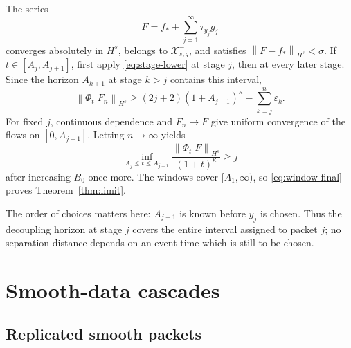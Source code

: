 \documentclass[10pt,a4paper]{amsart}
\numberwithin{equation}{section}
\newcommand{\X}{\mathcal X}
\newcommand{\eps}{\varepsilon}
\newcommand{\norm}[1]{\left\lVert #1\right\rVert}
\newcommand{\flow}[1]{\Phi^{#1}}
\newcommand{\trans}[1]{\tau_{#1}}
\begin{document}
The series
\begin{equation}\label{eq:F-limit}
 F=f_*+\sum_{j=1}^\infty\trans{y_j}g_j
\end{equation}
converges absolutely in $H^s$, belongs to $\X^-_{s,q}$, and satisfies
$\norm{F-f_*}_{H^s}<\sigma$.  If $t\in[A_j,A_{j+1}]$, first apply
\eqref{eq:stage-lower} at stage $j$, then at every later stage.  Since the
horizon $A_{k+1}$ at stage $k>j$ contains this interval,
\[
 \norm{\flow-_tF_n}_{H^s}
 \geq(2j+2)(1+A_{j+1})^\kappa-
 \sum_{k=j}^n\eps_k.
\]
For fixed $j$, continuous dependence and $F_n\to F$ give uniform convergence
of the flows on $[0,A_{j+1}]$.  Letting $n\to\infty$ yields
\begin{equation}\label{eq:window-final}
 \inf_{A_j\leq t\leq A_{j+1}}
 \frac{\norm{\flow-_tF}_{H^s}}{(1+t)^\kappa}
 \geq j
\end{equation}
after increasing $B_0$ once more.  The windows cover $[A_1,\infty)$, so
\eqref{eq:window-final} proves Theorem~\ref{thm:limit}.

The order of choices matters here: $A_{j+1}$ is known before $y_j$ is chosen.
Thus the decoupling horizon at stage $j$ covers the entire interval assigned
to packet $j$; no separation distance depends on an event time which is still
to be chosen.

\section{Smooth-data cascades}\label{sec:smooth-data}

\subsection{Replicated smooth packets}
\end{document}
